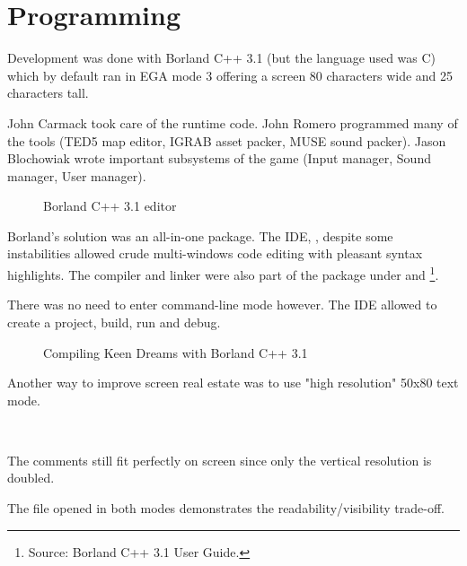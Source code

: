 \documentclass[book.tex]{subfiles}
\begin{document}
\section{Programming}



Development was done with Borland C++ 3.1 (but the language used was C) which by default ran in EGA mode 3 offering a screen 80 characters wide and 25 characters tall.\\
\par
John Carmack took care of the runtime code. John Romero programmed many of the tools (TED5 map editor, IGRAB asset packer, MUSE sound packer). Jason Blochowiak wrote important subsystems of the game (Input manager, Sound manager, User manager).\\

\begin{figure}[H]
\centering
\caption{Borland C++ 3.1 editor}
\end{figure}
\par
Borland's solution was an all-in-one package. The IDE, , despite some instabilities allowed crude multi-windows code editing with pleasant syntax highlights. The compiler and linker were also part of the package under  and \footnote{Source: Borland C++ 3.1 User Guide.}.
\pagebreak


There was no need to enter command-line mode however. The IDE allowed to create a project, build, run and debug.\\
\par
\begin{figure}[H]
\centering
  \caption{Compiling Keen Dreams with Borland C++ 3.1}
\end{figure}






Another way to improve screen real estate was to use "high resolution" 50x80 text mode.\\
\par 
 \\
 \par
 \vspace{-7pt}
The comments still fit perfectly on screen since only the vertical resolution is doubled.\\
\par
\vspace{-4pt}
 The file  opened in both modes demonstrates the readability/visibility trade-off.\\
\par
\end{document}
